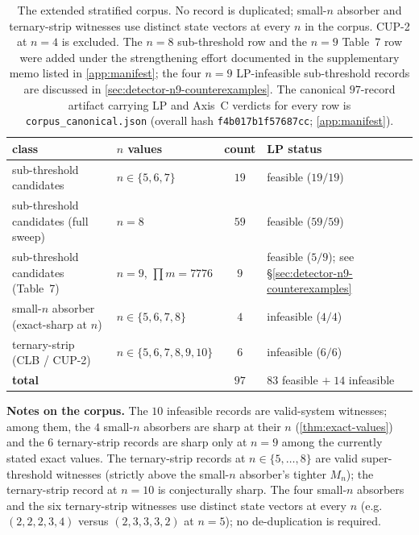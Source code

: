 \documentclass[11pt,a4paper]{article}
\theoremstyle{plain}
\theoremstyle{definition}
\newcommand{\Mn}{M_n}
\begin{document}
\begin{table}[ht]
\centering
\caption{The extended stratified corpus.  No record is duplicated;
small-$n$ absorber and ternary-strip witnesses use distinct state vectors
at every $n$ in the corpus.  CUP-2 at $n = 4$ is excluded.  The $n = 8$
sub-threshold row and the $n = 9$ Table~7 row were added under the
strengthening effort documented in the supplementary memo listed in
\cref{app:manifest}; the four $n = 9$ LP-infeasible sub-threshold
records are discussed in
\cref{sec:detector-n9-counterexamples}.  The canonical $97$-record
artifact carrying LP and Axis~C verdicts for every row is
\texttt{corpus\_canonical.json} (overall hash
\texttt{f4b017b1f57687cc}; \cref{app:manifest}).}\label{tab:corpus}
\begin{tabular}{l l c l}
\toprule
class & $n$ values & count & LP status\\\midrule
sub-threshold candidates              & $n \in \{5, 6, 7\}$       & $19$ & feasible ($19/19$)\\
sub-threshold candidates (full sweep) & $n = 8$                   & $59$ & feasible ($59/59$)\\
sub-threshold candidates (Table~7)    & $n = 9$, $\prod m = 7776$ & $9$ & feasible ($5/9$); see \S\ref{sec:detector-n9-counterexamples}\\
small-$n$ absorber (exact-sharp at $n$) & $n \in \{5, 6, 7, 8\}$  & $4$  & infeasible ($4/4$)\\
ternary-strip (CLB / CUP-2)           & $n \in \{5, 6, 7, 8, 9, 10\}$ & $6$ & infeasible ($6/6$)\\\midrule
\textbf{total}                        &                           & $97$ & $83$ feasible $+\;14$ infeasible\\
\bottomrule
\end{tabular}
\end{table}

\textbf{Notes on the corpus.}
The $10$ infeasible records are valid-system witnesses; among them, the
$4$ small-$n$ absorbers are sharp at their $n$
(\cref{thm:exact-values}) and the $6$ ternary-strip records
are sharp only at $n = 9$ among the currently stated exact values.  The ternary-strip records at
$n \in \{5, \ldots, 8\}$ are valid super-threshold witnesses
(strictly above the small-$n$ absorber's tighter $\Mn$); the
ternary-strip record at $n = 10$ is conjecturally sharp.  The four
small-$n$ absorbers and the six ternary-strip witnesses use distinct
state vectors at every $n$ (e.g.\ $(2, 2, 2, 3, 4)$ versus
$(2, 3, 3, 3, 2)$ at $n = 5$); no de-duplication is required.
\end{document}
